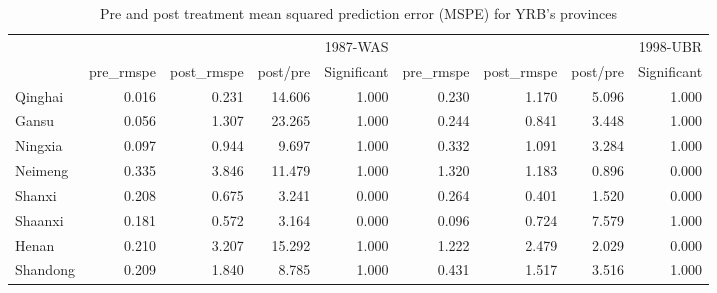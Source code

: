 \begin{table}
\caption{Pre and post treatment mean squared prediction error (MSPE) for YRB's provinces}
\begin{tabular}{lrrrrrrrr}
 & \multicolumn{4}{r}{1987-WAS} & \multicolumn{4}{r}{1998-UBR} \\
 & pre_rmspe & post_rmspe & post/pre & Significant & pre_rmspe & post_rmspe & post/pre & Significant \\
Qinghai & 0.016 & 0.231 & 14.606 & 1.000 & 0.230 & 1.170 & 5.096 & 1.000 \\
Gansu & 0.056 & 1.307 & 23.265 & 1.000 & 0.244 & 0.841 & 3.448 & 1.000 \\
Ningxia & 0.097 & 0.944 & 9.697 & 1.000 & 0.332 & 1.091 & 3.284 & 1.000 \\
Neimeng & 0.335 & 3.846 & 11.479 & 1.000 & 1.320 & 1.183 & 0.896 & 0.000 \\
Shanxi & 0.208 & 0.675 & 3.241 & 0.000 & 0.264 & 0.401 & 1.520 & 0.000 \\
Shaanxi & 0.181 & 0.572 & 3.164 & 0.000 & 0.096 & 0.724 & 7.579 & 1.000 \\
Henan & 0.210 & 3.207 & 15.292 & 1.000 & 1.222 & 2.479 & 2.029 & 0.000 \\
Shandong & 0.209 & 1.840 & 8.785 & 1.000 & 0.431 & 1.517 & 3.516 & 1.000 \\
\end{tabular}
\end{table}
